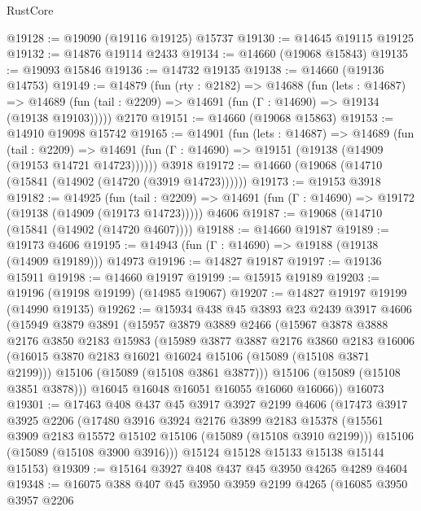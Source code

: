 \begin{lexlean}{RustCore}
\begin{coremodule}
@19128 := @19090 (@19116 @19125) @15737
@19130 := @14645 @19115 @19125
@19132 := @14876 @19114 @2433
@19134 := @14660 (@19068 @15843)
@19135 := @19093 @15846
@19136 := @14732 @19135
@19138 := @14660 (@19136 @14753)
@19149 := @14879
    (fun (rty : @2182) =>
    @14688
      (fun (lets : @14687) =>
      @14689 (fun (tail : @2209) => @14691 (fun (Γ : @14690) => @19134 (@19138 @19103)))))
    @2170
@19151 := @14660 (@19068 @15863)
@19153 := @14910 @19098 @15742
@19165 := @14901
    (fun (lets : @14687) =>
    @14689
      (fun (tail : @2209) =>
      @14691 (fun (Γ : @14690) => @19151 (@19138 (@14909 (@19153 @14721 @14723))))))
    @3918
@19172 := @14660 (@19068 (@14710 (@15841 (@14902 (@14720 (@3919 @14723))))))
@19173 := @19153 @3918
@19182 := @14925
    (fun (tail : @2209) => @14691 (fun (Γ : @14690) => @19172 (@19138 (@14909 (@19173 @14723)))))
    @4606
@19187 := @19068 (@14710 (@15841 (@14902 (@14720 @4607))))
@19188 := @14660 @19187
@19189 := @19173 @4606
@19195 := @14943 (fun (Γ : @14690) => @19188 (@19138 (@14909 @19189))) @14973
@19196 := @14827 @19187
@19197 := @19136 @15911
@19198 := @14660 @19197
@19199 := @15915 @19189
@19203 := @19196 (@19198 @19199) (@14985 @19067)
@19207 := @14827 @19197 @19199 (@14990 @19135)
@19262 := @15934
    @438
    @45
    @3893
    @23
    @2439
    @3917
    @4606
    (@15949
      @3879
      @3891
      (@15957
        @3879
        @3889
        @2466
        (@15967
          @3878
          @3888
          @2176
          @3850
          @2183
          @15983
          (@15989
            @3877
            @3887
            @2176
            @3860
            @2183
            @16006
            (@16015 @3870 @2183 @16021 @16024 @15106 (@15089 (@15108 @3871 @2199)))
            @15106
            (@15089 (@15108 @3861 @3877)))
          @15106
          (@15089 (@15108 @3851 @3878)))
        @16045
        @16048
        @16051
        @16055
        @16060
        @16066))
    @16073
@19301 := @17463
    @408
    @437
    @45
    @3917
    @3927
    @2199
    @4606
    (@17473
      @3917
      @3925
      @2206
      (@17480
        @3916
        @3924
        @2176
        @3899
        @2183
        @15378
        (@15561 @3909 @2183 @15572 @15102 @15106 (@15089 (@15108 @3910 @2199)))
        @15106
        (@15089 (@15108 @3900 @3916)))
      @15124
      @15128
      @15133
      @15138
      @15144
      @15153)
@19309 := @15164 @3927 @408 @437 @45 @3950 @4265 @4289 @4604
@19348 := @16075
    @388
    @407
    @45
    @3950
    @3959
    @2199
    @4265
    (@16085
      @3950
      @3957
      @2206

\end{coremodule}
\end{lexlean}
